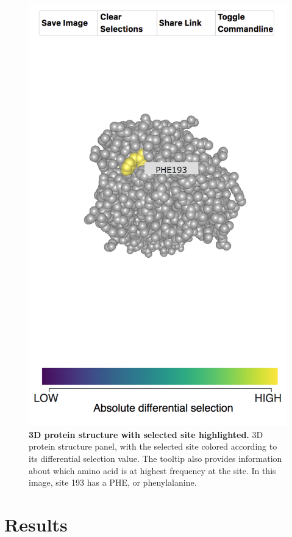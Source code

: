 \documentclass[sigchi]{acmart}
\begin{document}
\begin{figure}[H]
	\includegraphics[width=1.0\textwidth]{3d-structure-panel.png}
	\caption{\textbf{3D protein structure with selected site highlighted.}
  3D protein structure panel, with the selected site colored according to its differential selection value.
The tooltip also provides information about which amino acid is at highest frequency at the site.
In this image, site 193 has a PHE, or phenylalanine.
  }
	\label{3d-structure}
\end{figure}

\section{Results}
\end{document}
